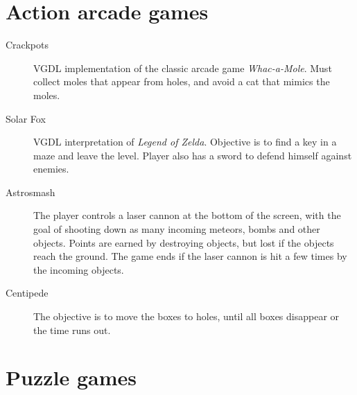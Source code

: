 \documentclass[a4paper,titlepage,final]{report}
\begin{document}
\begin{appendices}
\section{Action arcade games}

\begin{description}
\item [Crackpots] \citeyearpar{game:crackpots} VGDL implementation of the classic arcade game \emph{Whac-a-Mole}. Must collect moles that appear from holes, and avoid a cat that mimics the moles.
\item [Solar Fox] VGDL interpretation of \emph{Legend of Zelda}. Objective is to find a key in a maze and leave the level. Player also has a sword to defend himself against enemies.
\item [Astrosmash]  \citeyearpar{game:astrosmash} The player controls a laser cannon at the bottom of the screen, with the goal of shooting down as many incoming meteors, bombs and other objects. Points are earned by destroying objects, but lost if the objects reach the ground.
The game ends if the laser cannon is hit a few times  by the incoming objects.
\item [Centipede] The objective is to move the boxes to holes, until all boxes disappear or the time runs out.
\end{description}

\section{Puzzle games}


\end{appendices}
\end{document}
